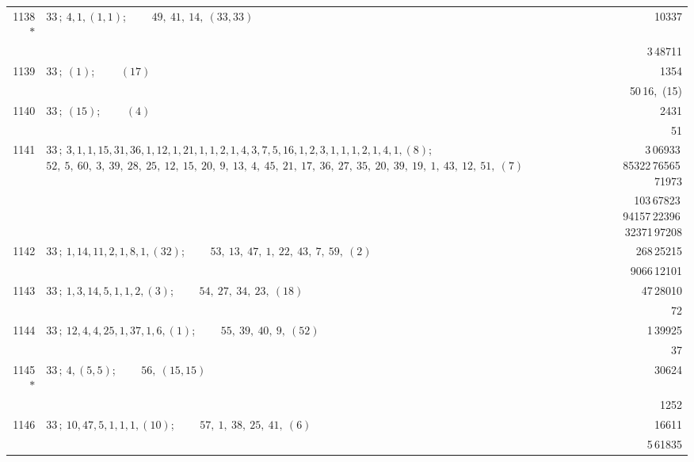 \documentclass[11pt]{article}
\providecommand{\asterism}{*}
\begin{document}
\begin{longtable}{|r|p{}|r|}
\hline
1138$\asterism$ & $33\,;\ 4, 1, (1, 1)$; \ \ \ \ $49,\ 41,\ 14,\ (33, 33)$ & 10337 \\
 & & 3\,48711 \\
\hline
1139 & $33\,;\ (1)$; \ \ \ \ $(17)$ & 1354 \\
 & & 50\,16,\ (15) \\
\hline
1140 & $33\,;\ (15)$; \ \ \ \ $(4)$ & 2431 \\
 & & 51 \\
\hline
1141 & $33\,;\ 3, 1, 1, 15, 31, 36, 1, 12, 1, 21, 1, 1, 2, 1, 4, 3, 7, 5, 16, 1, 2, 3, 1, 1, 1, 2, 1, 4, 1, (8)$; \ \ \ \ $52,\ 5,\ 60,\ 3,\ 39,\ 28,\ 25,\ 12,\ 15,\ 20,\ 9,\ 13,\ 4,\ 45,\ 21,\ 17,\ 36,\ 27,\ 35,\ 20,\ 39,\ 19,\ 1,\ 43,\ 12,\ 51,\ (7)$ & 3\,06933\,85322\,76565\,71973 \\
 & & 103\,67823\,94157\,22396\,32371\,97208 \\
\hline
1142 & $33\,;\ 1, 14, 11, 2, 1, 8, 1, (32)$; \ \ \ \ $53,\ 13,\ 47,\ 1,\ 22,\ 43,\ 7,\ 59,\ (2)$ & 268\,25215 \\
 & & 9066\,12101 \\
\hline
1143 & $33\,;\ 1, 3, 14, 5, 1, 1, 2, (3)$; \ \ \ \ $54,\ 27,\ 34,\ 23,\ (18)$ & 47\,28010 \\
 & & 72 \\
\hline
1144 & $33\,;\ 12, 4, 4, 25, 1, 37, 1, 6, (1)$; \ \ \ \ $55,\ 39,\ 40,\ 9,\ (52)$ & 1\,39925 \\
 & & 37 \\
\hline
1145$\asterism$ & $33\,;\ 4, (5, 5)$; \ \ \ \ $56,\ (15, 15)$ & 30624 \\
 & & 1252 \\
\hline
1146 & $33\,;\ 10, 47, 5, 1, 1, 1, (10)$; \ \ \ \ $57,\ 1,\ 38,\ 25,\ 41,\ (6)$ & 16611 \\
 & & 5\,61835 \\
\hline
\end{longtable}
\end{document}

